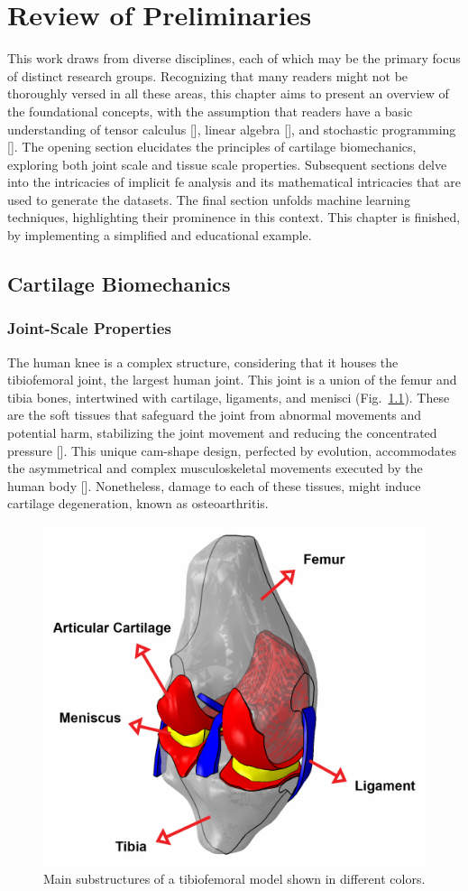 \documentclass[12pt,a4paper]{report}
\begin{document}
\chapter{Review of Preliminaries}
This work draws from diverse disciplines, each of which may be the primary focus of distinct research groups. Recognizing that many readers might not be thoroughly versed in all these areas, this chapter aims to present an overview of the foundational concepts, with the assumption that readers have a basic understanding of tensor calculus [\cite{fleisch2011}], linear algebra [\cite{strang2023}], and stochastic programming [\cite{birge2011}]. The opening section elucidates the principles of cartilage biomechanics, exploring both joint scale and tissue scale properties. Subsequent sections delve into the intricacies of implicit \ac{fe} analysis and its mathematical intricacies that are used to generate the datasets. The final section unfolds machine learning techniques, highlighting their prominence in this context. This chapter is finished, by implementing a simplified and educational example.

\section{Cartilage Biomechanics}
\subsection{Joint-Scale Properties}
The human knee is a complex structure, considering that it houses the tibiofemoral joint, the largest human joint. This joint is a union of the femur and tibia bones, intertwined with cartilage, ligaments, and menisci (Fig.~\ref{knee}).
These are the soft tissues that safeguard the joint from abnormal movements and potential harm, stabilizing the joint movement and reducing the concentrated pressure [\cite{walker1975,mameri2022}]. This unique cam-shape design, perfected by evolution, accommodates the asymmetrical and complex musculoskeletal movements executed by the human body [\cite{dye1987,goldblatt2003}]. Nonetheless, damage to each of these tissues, might induce cartilage degeneration, known as osteoarthritis.
%
\begin{figure}
\centering
\includegraphics[width=0.7\linewidth]{knee.jpg}
\caption{Main substructures of a tibiofemoral model shown in different colors.
\label{knee}}
\end{figure}
\end{document}
